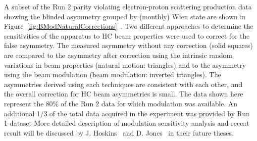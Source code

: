 A subset of the Run 2 parity violating electron-proton scattering production data showing the blinded asymmetry grouped by (monthly) Wien state are shown in Figure~\ref{fig:BModNaturalCorrections}~\cite{Allison:2014tpu}. Two different approaches to determine the sensitivities of the apparatus to HC beam properties were used to correct for the false asymmetry. The measured asymmetry without any correction (solid squares) are compared to the asymmetry after correction using the intrinsic random variations in beam properties (natural motion: triangles) and to the asymmetry using the beam modulation (beam modulation: inverted triangles). The asymmetries derived using each techniques are consistent with each other, and the overall correction for HC beam asymmetries is small. The data shown here represent the 80\% of the Run 2 data for which modulation was available. %
An additional 1/3 of the total data acquired in the experiment was provided by Run 1 dataset
More detailed description of modulation sensitivity analysis and recent result will be discussed by J. Hoskins~\cite{jhoskins_thesis} and D. Jones~\cite{don_thesis} in their future theses.

